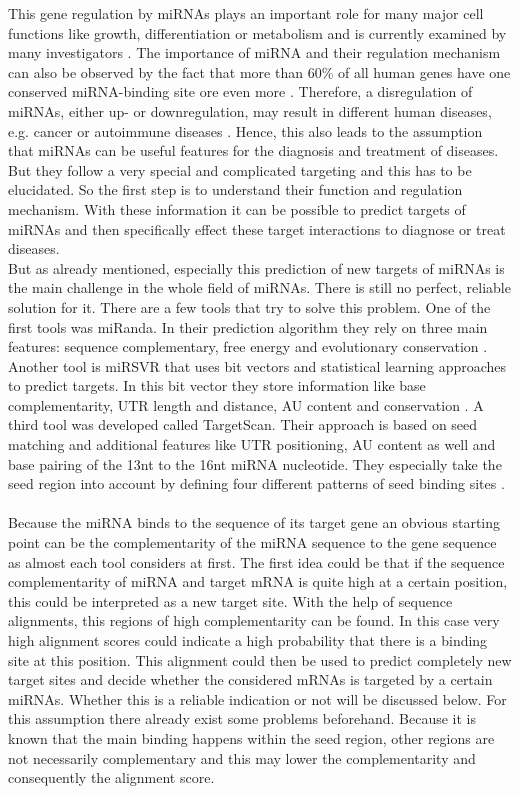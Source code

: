 \documentclass[12pt]{article}
\begin{document}
This gene regulation by miRNAs plays an important role for many major cell functions like growth, differentiation or metabolism and is currently examined by many investigators \cite{Ardekani}. The importance of miRNA and their regulation mechanism can also be observed by the fact that more than 60\% of all human genes have one conserved miRNA-binding site ore even more \cite{Friedman}. Therefore, a disregulation of miRNAs, either up- or downregulation, may result in different human diseases, e.g. cancer or autoimmune diseases \cite{Ardekani}. Hence, this also leads to the assumption that miRNAs can be useful features for the diagnosis and treatment of diseases. But they follow a very special and complicated targeting and this has to be elucidated. So the first step is to understand their function and regulation mechanism. With these information it can be possible to predict targets of miRNAs and then specifically effect these target interactions to diagnose or treat diseases. \\
But as already mentioned, especially this prediction of new targets of miRNAs is the main challenge in the whole field of miRNAs. There is still no perfect, reliable solution for it. There are a few tools that try to solve this problem. One of the first tools was miRanda. In their prediction algorithm they rely on three main features: sequence complementary, free energy and evolutionary conservation \cite{Enright}. Another tool is miRSVR that uses bit vectors and statistical learning approaches to predict targets. In this bit vector they store information like base complementarity, UTR length and distance, AU content and conservation \cite{Betel}. A third tool was developed called TargetScan. Their approach is based on seed matching and additional features like UTR positioning, AU content as well and base pairing of the 13nt to the 16nt miRNA nucleotide. They especially take the seed region into account by defining four different patterns of seed binding sites \cite{Lewis}.\\\\
Because the miRNA binds to the sequence of its target gene an obvious starting point can be the complementarity of the miRNA sequence to the gene sequence as almost each tool considers at first. The first idea could be that if the sequence complementarity of miRNA and target mRNA is quite high at a certain position, this could be interpreted as a new target site. With the help of sequence alignments, this regions of high complementarity can be found. In this case very high alignment scores could indicate a high probability that there is a binding site at this position. This alignment could then be used to predict completely new target sites and decide whether the considered mRNAs is targeted by a certain miRNAs. Whether this is a reliable indication or not will be discussed below. For this assumption there already exist some problems beforehand. Because it is known that the main binding happens within the seed region, other regions are not necessarily complementary and this may lower the complementarity and consequently the alignment score. \\\\
\end{document}
